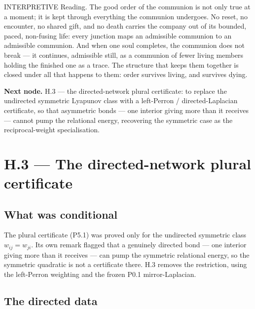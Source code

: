 \documentclass[11pt,a4paper]{article}
\def\emph#1{#1}%
\newcommand{\stInterp}{\textcolor{cInt}{\textsf{\small INTERPRETIVE}}}
\theoremstyle{definition}
\theoremstyle{plain}
\theoremstyle{remark}
\begin{document}
\medskip
\stInterp\quad
\emph{Reading.}
The good order of the communion is not only true at a moment; it is kept through everything
the communion undergoes. No reset, no encounter, no shared gift, and no death carries the
company out of its bounded, paced, non-fusing life: every junction maps an admissible
communion to an admissible communion. And when one soul completes, the communion does not
break --- it continues, admissible still, as a communion of fewer living members holding the
finished one as a trace. The structure that keeps them together is closed under all that
happens to them: order survives living, and survives dying.

\medskip
\textbf{Next node.} H.3 --- the directed-network plural certificate: to replace the undirected
symmetric Lyapunov class with a left-Perron / directed-Laplacian certificate, so that
asymmetric bonds --- one interior giving more than it receives --- cannot pump the relational
energy, recovering the symmetric case as the reciprocal-weight specialisation.

\section{H.3 --- The directed-network plural certificate}

\subsection{What was conditional}

The plural certificate (P5.1) was proved only for the undirected symmetric class
\(w_{ij}=w_{ji}\). Its own remark flagged that a genuinely directed bond --- one interior
giving more than it receives --- can \emph{pump} the symmetric relational energy, so the
symmetric quadratic is not a certificate there. H.3 removes the restriction, using the
left-Perron weighting and the frozen P0.1 mirror-Laplacian.

\subsection{The directed data}
\end{document}
